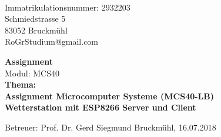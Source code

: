 \documentclass[12pt,a4paper]{scrartcl}	%
\begin{document}
\begin{titlepage}
	\\
	Immatrikulationsnummer:	2932203\\
	Schmiedstrasse 5\\
	83052 Bruckmühl\\
	RoGrStudium@gmail.com\\
	\vspace{5cm}
	
	\begin{center}
		{\Huge \textbf{Assignment} }\\ 
		Modul: MCS40\\
		\vspace{1cm}
		\textbf{Thema:}\\
		\textbf{\large{Assignment Microcomputer Systeme (MCS40-LB)}}\\
		\textbf{Wetterstation mit ESP8266 Server und Client}
		
	\end{center}
	
	\vspace{6cm}
	Betreuer: Prof. Dr. Gerd Siegmund
	\vfill Bruckmühl, 16.07.2018

\end{titlepage}
\newpage
\tableofcontents
\newpage
\clearpage
\thispagestyle{empty}
\listoffigures
\newpage

\clearpage
\thispagestyle{empty}
\newpage

\setcounter{page}{1}
\end{document}
